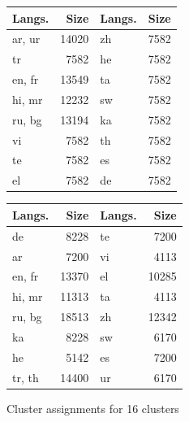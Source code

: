 \begin{figure}[p]
    \centering
    
    \begin{subtable}{0.49\textwidth}
        \centering
        \begin{tabular}{lrlr}
            \toprule
            Langs. & Size & Langs. & Size \\
            \midrule
            ar, ur & 14020 & zh & 7582 \\
            tr & 7582 & he & 7582 \\
            en, fr & 13549 & ta & 7582 \\
            hi, mr & 12232 & sw & 7582 \\
            ru, bg & 13194 & ka & 7582 \\
            vi & 7582 & th & 7582 \\
            te & 7582 & es & 7582 \\
            el & 7582 & de & 7582 \\
            \bottomrule
        \end{tabular}
        \caption{\citet{chung_improving_2020}}
        \label{tab:chung_clusters_k16}
        

    \end{subtable}
    \hfill
    \begin{subtable}{0.49\textwidth}
        \centering
        \begin{tabular}{lrlr}
            \toprule
            Langs. & Size & Langs. & Size \\
            \midrule
            de & 8228 & te & 7200 \\
            ar & 7200 & vi & 4113 \\
            en, fr & 13370 & el & 10285 \\
            hi, mr & 11313 & ta & 4113 \\
            ru, bg & 18513 & zh & 12342 \\
            ka & 8228 & sw & 6170 \\
            he & 5142 & es & 7200 \\
            tr, th & 14400 & ur & 6170 \\
            \bottomrule
        \end{tabular}
        \caption{\citet{liang_xlm-v_2023}}
        \label{tab:liang_clusters_k16}
    \end{subtable}

    \caption{Cluster assignments for 16 clusters}
    \label{fig:cluster_assignments_k16}
\end{figure}

